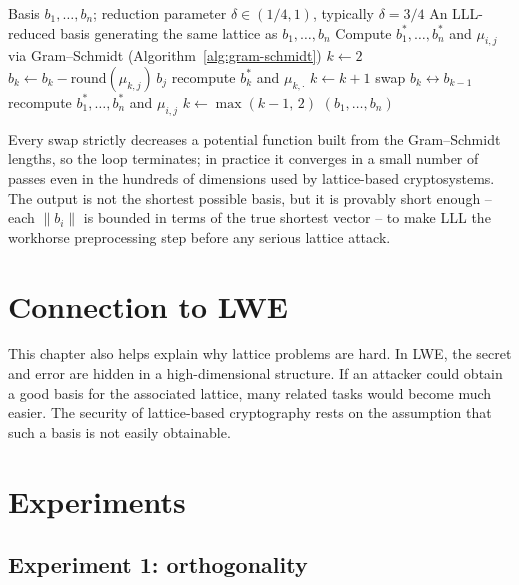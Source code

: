 \begin{algorithm}[H]
\caption{LLL Lattice Basis Reduction}
\label{alg:lll}
\begin{algorithmic}[1]
\Require Basis $b_1,\dots,b_n$; reduction parameter $\delta \in (1/4,1)$, typically $\delta = 3/4$
\Ensure An LLL-reduced basis generating the same lattice as $b_1,\dots,b_n$
\State Compute $b_1^*,\dots,b_n^*$ and $\mu_{i,j}$ via Gram--Schmidt (Algorithm~\ref{alg:gram-schmidt})
\State $k \gets 2$
     
            \State $b_k \gets b_k - \mathrm{round}(\mu_{k,j})\, b_j$
            \State recompute $b_k^*$ and $\mu_{k,\cdot}$
        \EndIf
    \EndFor
     
        \State $k \gets k+1$
    \Else
        \State swap $b_k \leftrightarrow b_{k-1}$
        \State recompute $b_1^*,\dots,b_n^*$ and $\mu_{i,j}$
        \State $k \gets \max(k-1,\,2)$
    \EndIf
\EndWhile
\State \Return $(b_1,\dots,b_n)$
\end{algorithmic}
\end{algorithm}

Every swap strictly decreases a potential function built from the Gram--Schmidt lengths, so the loop terminates; in practice it converges in a small number of passes even in the hundreds of dimensions used by lattice-based cryptosystems. The output is not the shortest possible basis, but it is provably short enough -- each $\|b_i\|$ is bounded in terms of the true shortest vector -- to make LLL the workhorse preprocessing step before any serious lattice attack.

\section{Connection to LWE}
This chapter also helps explain why lattice problems are hard. In LWE, the secret and error are hidden in a high-dimensional structure. If an attacker could obtain a good basis for the associated lattice, many related tasks would become much easier. The security of lattice-based cryptography rests on the assumption that such a basis is not easily obtainable.

\section{Experiments}

\subsection{Experiment 1: orthogonality}

